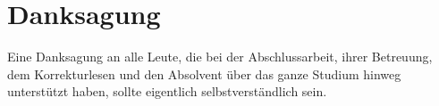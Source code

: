 \chapter*{Danksagung}

Eine Danksagung an alle Leute, die bei der Abschlussarbeit, ihrer Betreuung,
dem Korrekturlesen und den Absolvent über das ganze Studium hinweg
unterstützt haben, sollte eigentlich selbstverständlich sein.

